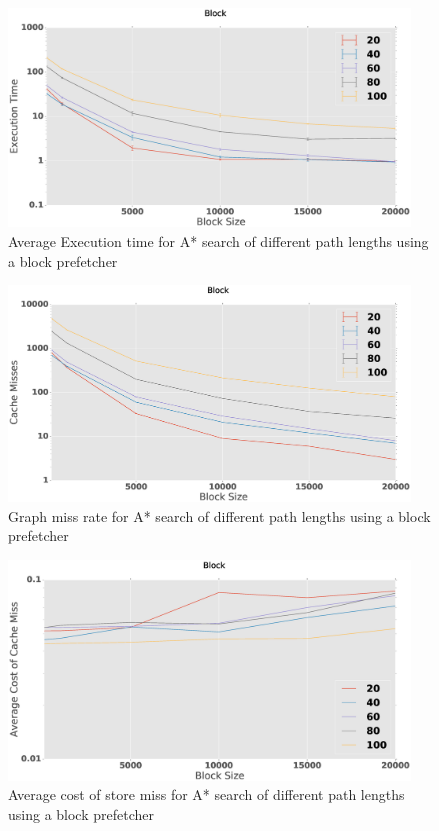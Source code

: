 \begin{figure}[htbp]
	\centering
	\includegraphics[width=0.95\textwidth]{figs/prefetch-block.eps}
	\caption{Average Execution time for A* search of different path lengths using a block prefetcher}
	\label{fig:prefetch-block}
\end{figure}
\begin{figure}[htbp]
	\centering
	\includegraphics[width=0.95\textwidth]{figs/prefetch-misses-block.eps}
	\caption{Graph miss rate for A* search of different path lengths using a block prefetcher}
	\label{fig:prefetch-miss-block}
\end{figure}
\begin{figure}[htbp]
	\centering
	\includegraphics[width=0.95\textwidth]{figs/prefetch-dbcost-block.eps}
	\caption{Average cost of store miss for A* search of different path lengths using a block prefetcher}
	\label{fig:prefetch-dbcost-block}
\end{figure}


